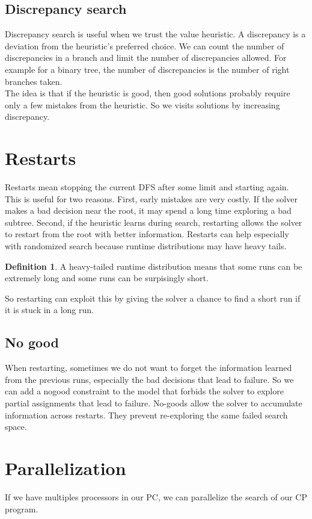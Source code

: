 \documentclass[12pt, openany]{report}
\theoremstyle{definition}
\newtheorem{definition}[thm]{Definition}
\begin{document}
\subsection{Discrepancy search}
Discrepancy search is useful when we trust the value heuristic. A discrepancy is a deviation from the heuristic’s preferred choice. We can count the number of discrepancies in a branch and limit the number of discrepancies allowed. For example for a binary tree, the number of discrepancies is the number of right branches taken.\\
The idea is that if the heuristic is good, then good solutions probably require only a few mistakes from the heuristic. So we visits solutions by increasing discrepancy.
\section{Restarts}
Restarts mean stopping the current DFS after some limit and starting again. This is useful for two reasons. First, early mistakes are very costly. If the solver makes a bad decision near the root, it may spend a long time exploring a bad subtree. Second, if the heuristic learns during search, restarting allows the solver to restart from the root with better information. Restarts can help especially with randomized search because runtime distributions may have heavy tails.
\begin{definition}
    A heavy-tailed runtime distribution means that some runs can be extremely long and some runs can be surpisingly short. 
\end{definition}
So restarting can exploit this by giving the solver a chance to find a short run if it is stuck in a long run.\\
\subsection{No good}
When restarting, sometimes we do not want to forget the information learned from the previous runs, especially the bad decisions that lead to failure. So we can add a nogood constraint to the model that forbids the solver to explore partial assignments that lead to failure. No-goods allow the solver to accumulate information across restarts. They prevent re-exploring the same failed search space.
\section{Parallelization}
If we have multiples processors in our PC, we can parallelize the search of our CP program.
\end{document}
